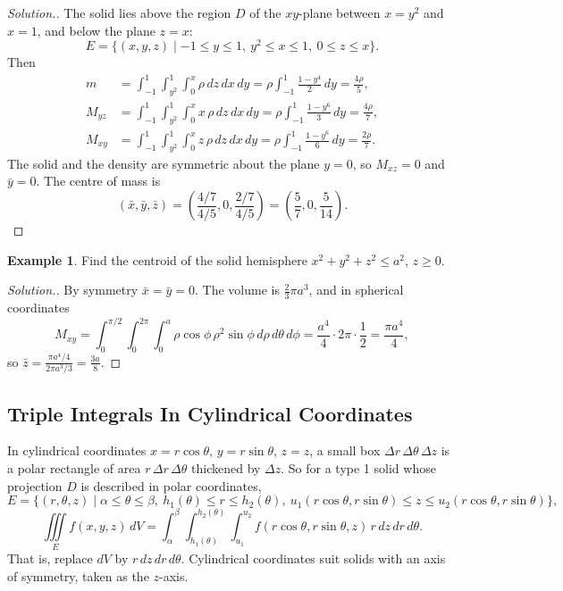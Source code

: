 \documentclass[11pt,a4paper]{article}
\theoremstyle{definition}
\newtheorem{exa}[thm]{Example}
\newenvironment{solution}
  {\renewcommand{\qedsymbol}{}\begin{proof}[\textit{Solution}.]}
  {\end{proof}}
\begin{document}
\begin{solution}
The solid lies above the region $D$ of the $xy$-plane between $x = y^2$ and
$x = 1$, and below the plane $z = x$:
\[E = \{(x,y,z) \mid -1\leq y\leq 1,\ y^2 \leq x \leq 1,\ 0 \leq z \leq x\} .\]
Then
\begin{align*}
m & = \int^1_{-1}\int^1_{y^2}\int^x_0\rho \, dz\,dx\,dy = \rho\int_{-1}^1
\frac{1 - y^4}{2}\,dy = \frac{4\rho}{5},\\
M_{yz} & = \int^1_{-1}\int^1_{y^2}\int^x_0 x\,\rho \, dz\, dx\, dy =
\rho\int_{-1}^1\frac{1 - y^6}{3}\,dy = \frac{4\rho}{7},\\
M_{xy} & = \int^1_{-1}\int^1_{y^2}\int^x_0z \,\rho \, dz\,dx\,dy =
\rho\int_{-1}^1\frac{1 - y^6}{6}\,dy = \frac{2\rho}{7} .
\end{align*}
The solid and the density are symmetric about the plane $y = 0$, so
$M_{xz} = 0$ and $\bar y = 0$. The centre of mass is
\[(\bar x,\bar y, \bar z) = \left(\frac{4/7}{4/5}, 0, \frac{2/7}{4/5}\right) =
\left(\frac{5}{7}, 0, \frac{5}{14}\right) .\]
\end{solution}

\begin{exa}
\label{ex:hemispherecentroid}
Find the centroid of the solid hemisphere $x^2 + y^2 + z^2\leq a^2$, $z\geq 0$.
\end{exa}

\begin{solution}
By symmetry $\bar x = \bar y = 0$. The volume is $\frac23\pi a^3$, and in
spherical coordinates
\[M_{xy} = \int_0^{\pi/2}\int_0^{2\pi}\int_0^a\rho\cos\phi\,\rho^2\sin\phi\,
d\rho\,d\theta\,d\phi = \frac{a^4}{4}\cdot 2\pi\cdot\frac12 = \frac{\pi a^4}{4},\]
so $\bar z = \frac{\pi a^4/4}{2\pi a^3/3} = \frac{3a}{8}$.
\end{solution}

{\color[wave]{485}\subsection{Triple Integrals In Cylindrical Coordinates}}

In cylindrical coordinates $x = r\cos\theta$, $y = r\sin\theta$, $z = z$, a
small box $\Delta r\,\Delta\theta\,\Delta z$ is a polar rectangle of area
$r\,\Delta r\,\Delta\theta$ thickened by $\Delta z$. So for a type 1 solid whose
projection $D$ is described in polar coordinates,
\[E = \{(r,\theta,z) \mid \alpha\leq\theta\leq\beta,\ h_1(\theta)\leq r\leq
h_2(\theta),\ u_1(r\cos\theta,r\sin\theta)\leq z\leq
u_2(r\cos\theta,r\sin\theta)\},\]
\[\iiint\limits_E f(x,y,z)\,dV = \int_\alpha^\beta\int_{h_1(\theta)}^{h_2(\theta)}
\int_{u_1}^{u_2} f(r\cos\theta, r\sin\theta, z)\,r\,dz\,dr\,d\theta .\]
That is, replace $dV$ by $r\,dz\,dr\,d\theta$. Cylindrical coordinates suit
solids with an axis of symmetry, taken as the $z$-axis.
\end{document}
